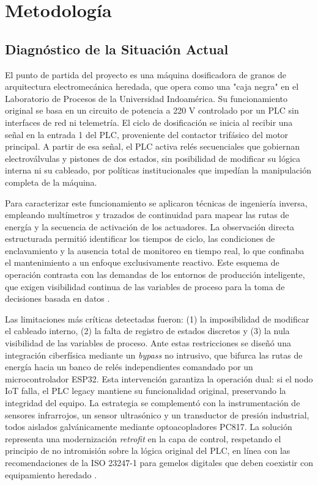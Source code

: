 \chapter{Metodología}
\label{chap:metodologia}

\section{Diagnóstico de la Situación Actual}

El punto de partida del proyecto es una máquina dosificadora de granos de arquitectura electromecánica heredada, que opera como una "caja negra" en el Laboratorio de Procesos de la Universidad Indoamérica. Su funcionamiento original se basa en un circuito de potencia a 220 V controlado por un PLC sin interfaces de red ni telemetría. El ciclo de dosificación se inicia al recibir una señal en la entrada 1 del PLC, proveniente del contactor trifásico del motor principal. A partir de esa señal, el PLC activa relés secuenciales que gobiernan electroválvulas y pistones de dos estados, sin posibilidad de modificar su lógica interna ni su cableado, por políticas institucionales que impedían la manipulación completa de la máquina.

Para caracterizar este funcionamiento se aplicaron técnicas de ingeniería inversa, empleando multímetros y trazados de continuidad para mapear las rutas de energía y la secuencia de activación de los actuadores. La observación directa estructurada permitió identificar los tiempos de ciclo, las condiciones de enclavamiento y la ausencia total de monitoreo en tiempo real, lo que confinaba el mantenimiento a un enfoque exclusivamente reactivo. Este esquema de operación contrasta con las demandas de los entornos de producción inteligente, que exigen visibilidad continua de las variables de proceso para la toma de decisiones basada en datos \cite{retrofitting2025}.

Las limitaciones más críticas detectadas fueron: (1) la imposibilidad de modificar el cableado interno, (2) la falta de registro de estados discretos y (3) la nula visibilidad de las variables de proceso. Ante estas restricciones se diseñó una integración ciberfísica mediante un \textit{bypass} no intrusivo, que bifurca las rutas de energía hacia un banco de relés independientes comandado por un microcontrolador ESP32. Esta intervención garantiza la operación dual: si el nodo IoT falla, el PLC legacy mantiene su funcionalidad original, preservando la integridad del equipo. La estrategia se complementó con la instrumentación de sensores infrarrojos, un sensor ultrasónico y un transductor de presión industrial, todos aislados galvánicamente mediante optoacopladores PC817. La solución representa una modernización \textit{retrofit} en la capa de control, respetando el principio de no intromisión sobre la lógica original del PLC, en línea con las recomendaciones de la ISO 23247-1 para gemelos digitales que deben coexistir con equipamiento heredado \cite{iso23247-1}.

